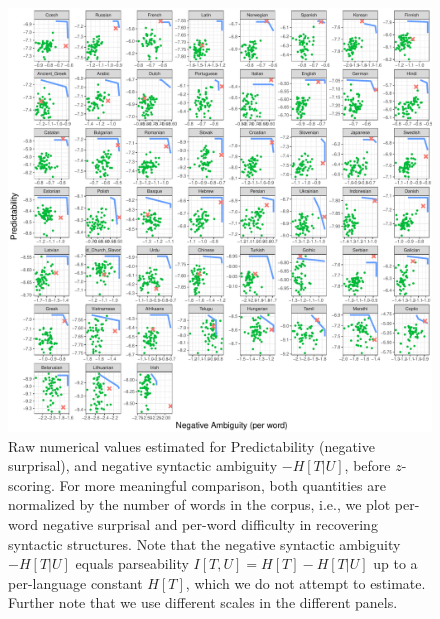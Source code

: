 \documentclass[10pt,twoside,lineno]{article}
\begin{document}
\begin{figure}
\centering
\includegraphics[width=\textwidth]{../results/plane/pareto-plane-perLanguage-raw.pdf}
	\caption[Predictability and Parseability]{Raw numerical values estimated for Predictability (negative surprisal), and negative syntactic ambiguity $-H[T|U]$, before $z$-scoring. For more meaningful comparison, both quantities are normalized by the number of words in the corpus, i.e., we plot per-word negative surprisal and per-word difficulty in recovering syntactic structures.  Note that the negative syntactic ambiguity $-H[T|U]$ equals parseability $I[T,U] = H[T] - H[T|U]$ up to a per-language constant $H[T]$, which we do not attempt to estimate. Further note that we use different scales in the different panels. }\label{fig:pareto-per-lang-raw}
\end{figure}



%



\end{document}
